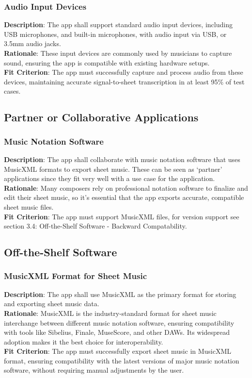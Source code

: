 \documentclass[12pt]{article}
\begin{document}
\subsubsection*{Audio Input Devices}
\textbf{Description}: The app shall support standard audio input devices, including USB microphones, and built-in microphones, with audio input via USB, or 3.5mm audio jacks.\\
\textbf{Rationale}: These input devices are commonly used by musicians to capture sound, ensuring the app is compatible with existing hardware setups.\\
\textbf{Fit Criterion}: The app must successfully capture and process audio from these devices, maintaining accurate signal-to-sheet transcription in at least 95\% of test cases.

\subsection{Partner or Collaborative Applications}
\subsubsection*{Music Notation Software}
\textbf{Description}: The app shall collaborate with music notation software that uses MusicXML formats to export sheet music. These can be seen as ‘partner’ applications since they fit very well with a use case for the application.\\
\textbf{Rationale}: Many composers rely on professional notation software to finalize and edit their sheet music, so it’s essential that the app exports accurate, compatible sheet music files.\\
\textbf{Fit Criterion}: The app must support MusicXML files, for version support see section 3.4: Off-the-Shelf Software - Backward Compatability.

\subsection{Off-the-Shelf Software}
\subsubsection*{MusicXML Format for Sheet Music}
\textbf{Description}: The app shall use MusicXML as the primary format for storing and exporting sheet music data.\\
\textbf{Rationale}: MusicXML is the industry-standard format for sheet music interchange between different music notation software, ensuring compatibility with tools like Sibelius, Finale, MuseScore, and other DAWs. Its widespread adoption makes it the best choice for interoperability.\\
\textbf{Fit Criterion}: The app must successfully export sheet music in MusicXML format, ensuring compatibility with the latest versions of major music notation software, without requiring manual adjustments by the user.
\end{document}

